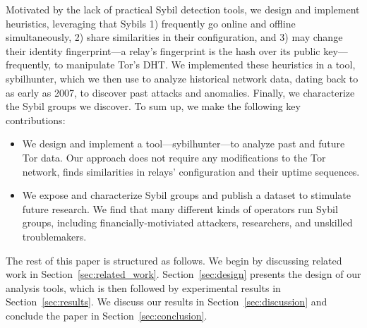 Motivated by the lack of practical Sybil detection tools, we design and
implement heuristics, leveraging that Sybils 1) frequently go online and offline
simultaneously, 2) share similarities in their configuration, and 3) may change
their identity fingerprint---a relay's fingerprint is the hash over its public
key---frequently, to manipulate Tor's DHT.  We implemented
these heuristics in a tool, sybilhunter, which we then use to analyze historical
network data, dating back to as early as 2007, to discover past attacks and
anomalies.  Finally, we characterize the Sybil groups we discover.  To sum up,
we make the following key contributions:
\begin{itemize}
	\item We design and implement a tool---sybilhunter---to analyze past and
		future Tor data.  Our approach does not require any modifications to the
		Tor network, finds similarities in relays' configuration and their
		uptime sequences.
	\item We expose and characterize Sybil groups and publish a dataset to
		stimulate future research.  We find that many different kinds of
		operators run Sybil groups, including financially-motiviated attackers,
		researchers, and unskilled troublemakers.
\end{itemize}

The rest of this paper is structured as follows.  We begin by discussing
related work in Section~\ref{sec:related_work}.  Section~\ref{sec:design}
presents the design of our analysis tools, which is then followed by
experimental results in Section~\ref{sec:results}.  We discuss our results in
Section~\ref{sec:discussion} and conclude the paper in
Section~\ref{sec:conclusion}.
